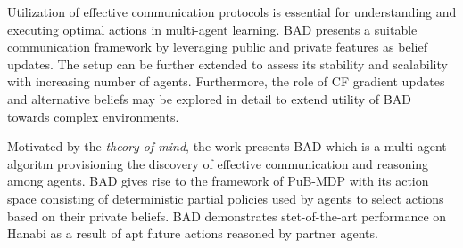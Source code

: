 \documentclass[11pt,letterpaper]{article}
\begin{document}
Utilization of effective communication protocols is essential for understanding and executing optimal actions in multi-agent learning. BAD presents a suitable communication framework by leveraging public and private features as belief updates. The setup can be further extended to assess its stability and scalability with increasing number of agents. Furthermore, the role of CF gradient updates and alternative beliefs may be explored in detail to extend utility of BAD towards complex environments.

Motivated by the \textit{theory of mind}, the work presents BAD which is a multi-agent algoritm provisioning the discovery of effective communication and reasoning among agents. BAD gives rise to the framework of PuB-MDP with its action space consisting of deterministic partial policies used by agents to select actions based on their private beliefs. BAD demonstrates stet-of-the-art performance on Hanabi as a result of apt future actions reasoned by partner agents. 
\end{document}
